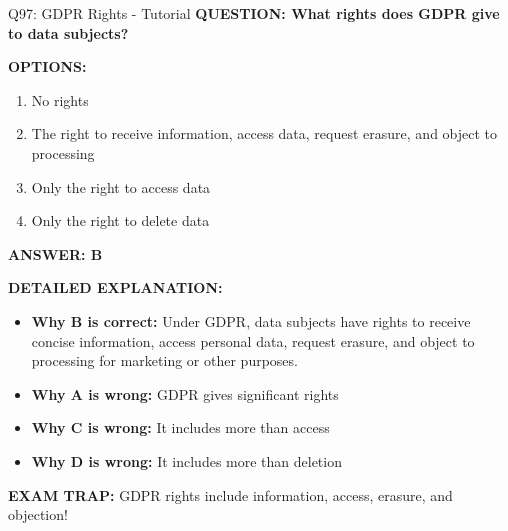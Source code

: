 \documentclass[8pt]{beamer}
\begin{document}
	\begin{frame}{Q97: GDPR Rights - Tutorial}
		\fontsize{6.5}{7.5}\selectfont
		\textbf{QUESTION: What rights does GDPR give to data subjects?}
		
		\vspace{0.1cm}
		\textbf{OPTIONS:}
		\begin{enumerate}
			\item No rights
			\item The right to receive information, access data, request erasure, and object to processing
			\item Only the right to access data
			\item Only the right to delete data
		\end{enumerate}
		
		\vspace{0.1cm}
		\textcolor{myblue}{\textbf{ANSWER: B}}
		
		\vspace{0.1cm}
		\textbf{DETAILED EXPLANATION:}
		\begin{itemize}
			\item \textbf{Why B is correct:} Under GDPR, data subjects have rights to receive concise information, access personal data, request erasure, and object to processing for marketing or other purposes.
			\item \textbf{Why A is wrong:} GDPR gives significant rights
			\item \textbf{Why C is wrong:} It includes more than access
			\item \textbf{Why D is wrong:} It includes more than deletion
		\end{itemize}
		
		\textcolor{myred}{\textbf{EXAM TRAP:}} GDPR rights include \textcolor{myblue}{information, access, erasure, and objection}!
	\end{frame}
	
\end{document}
